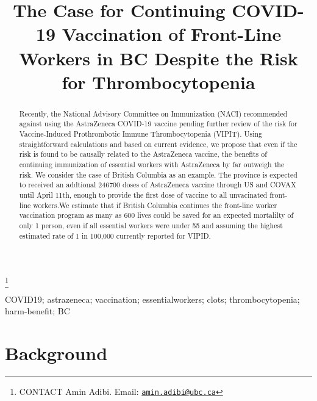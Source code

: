 \documentclass[]{interact}
\theoremstyle{plain}%
\theoremstyle{definition}
\theoremstyle{remark}
\begin{document}

\title{The Case for Continuing COVID-19 Vaccination of Front-Line
Workers in BC Despite the Risk for Thrombocytopenia}


\author{
}

\thanks{CONTACT Amin
Adibi. Email: \href{mailto:amin.adibi@ubc.ca}{\nolinkurl{amin.adibi@ubc.ca}}}

\maketitle

\begin{abstract}
Recently, the National Advisory Committee on Immunization (NACI)
recommended against using the AstraZeneca COVID-19 vaccine pending
further review of the risk for Vaccine-Induced Prothrombotic Immune
Thrombocytopenia (VIPIT). Using straightforward calculations and based
on current evidence, we propose that even if the risk is found to be
causally related to the AstraZeneca vaccine, the benefits of continuing
immunization of essential workers with AstraZeneca by far outweigh the
risk. We consider the case of British Columbia as an example. The
province is expected to received an addtional 246700 doses of
AstraZeneca vaccine through US and COVAX until April 11th, enough to
provide the first dose of vaccine to all unvacinated front-line
workers.We estimate that if British Columbia continues the front-line
worker vaccination program as many as 600 lives could be saved for an
expected mortalilty of only 1 person, even if all essential workers were
under 55 and assuming the highest estimated rate of 1 in 100,000
currently reported for VIPID.
\end{abstract}

\begin{keywords}
COVID19; astrazeneca; vaccination; essentialworkers; clots;
thrombocytopenia; harm-benefit; BC
\end{keywords}

\hypertarget{background}{%
\section{Background}\label{background}}
\end{document}
